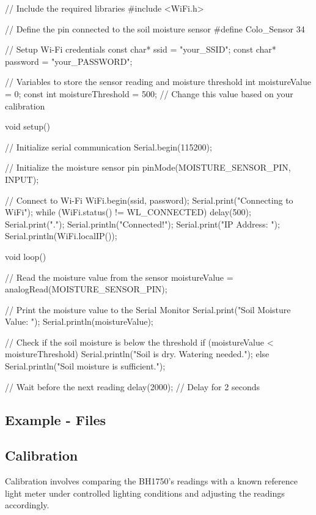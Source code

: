 \begin{Arduino}
	// Include the required libraries
	#include <WiFi.h>
	
	// Define the pin connected to the soil moisture sensor
	#define Colo_Sensor 34
	
	// Setup Wi-Fi credentials
	const char* ssid = "your_SSID";
	const char* password = "your_PASSWORD";
	
	// Variables to store the sensor reading and moisture threshold
	int moistureValue = 0;
	const int moistureThreshold = 500; // Change this value based on your calibration
	
	void setup() {
		// Initialize serial communication
		Serial.begin(115200);
		
		// Initialize the moisture sensor pin
		pinMode(MOISTURE_SENSOR_PIN, INPUT);
		
		// Connect to Wi-Fi
		WiFi.begin(ssid, password);
		Serial.print("Connecting to WiFi");
		while (WiFi.status() != WL_CONNECTED) {
			delay(500);
			Serial.print(".");
		}
		Serial.println("Connected!");
		Serial.print("IP Address: ");
		Serial.println(WiFi.localIP());
	}
	
	void loop() {
		// Read the moisture value from the sensor
		moistureValue = analogRead(MOISTURE_SENSOR_PIN);
		
		// Print the moisture value to the Serial Monitor
		Serial.print("Soil Moisture Value: ");
		Serial.println(moistureValue);
		
		// Check if the soil moisture is below the threshold
		if (moistureValue < moistureThreshold) {
			Serial.println("Soil is dry. Watering needed.");
		} else {
			Serial.println("Soil moisture is sufficient.");
		}
		
		// Wait before the next reading
		delay(2000); // Delay for 2 seconds
	}
	
	
	
\end{Arduino}



\subsection{Example - Files}



\subsection{Calibration}

Calibration involves comparing the BH1750's readings with a known reference light meter under controlled lighting conditions and adjusting the readings accordingly.

